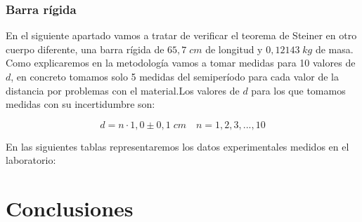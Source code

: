\documentclass[a4paper,12pt,titlepage]{article}
\begin{document}
\subsubsection{Barra rígida}

En el siguiente apartado vamos a tratar de verificar el teorema de Steiner en otro cuerpo diferente, una barra rígida de $65,7 \; cm$ de longitud y $0,12143 \; kg$ de masa. Como explicaremos en la metodología vamos a tomar medidas para 10 valores de $d$, en concreto tomamos solo 5 medidas del semiperíodo para cada valor de la distancia por problemas con el material.Los valores de $d$ para los que tomamos medidas con su incertidumbre son:

\begin{equation}
    d = n\cdot 1,0 \pm 0,1 \; cm \quad n = 1,2,3,...,10
\end{equation}

En las siguientes tablas representaremos los datos experimentales medidos en el laboratorio:








\section{Conclusiones}
\end{document}
